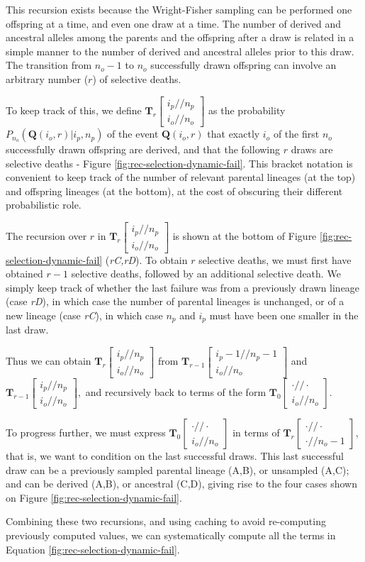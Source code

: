 \documentclass[review]{elsarticle}
\newcommand{\dslash}{/\!\!/}
\newcommand{\Coalc}[4]{\begin{bmatrix}#1\dslash #2 \\ #3\dslash #4 \end{bmatrix}}
\begin{document}
This recursion exists because the Wright-Fisher sampling can be performed one offspring at a time,
and even one draw at a time. The number of derived and ancestral alleles among the parents and the
offspring after a draw is related in a simple manner to the number of derived and ancestral alleles
prior to this draw. The transition from $n_o-1$ to $n_o$ successfully drawn offspring can involve an
arbitrary number ($r$) of selective deaths. 

To keep track of this, we define $\mathbf{T}_{r}\Coalc{i_p}{n_p}{i_o}{n_o}$ as the probability
$P_{n_o}(\mathbf{Q}(i_o,r) | i_p, n_p)$ of the event $\mathbf{Q}(i_o,r)$ that exactly $i_o$ of the
first $n_o$ successfully drawn offspring are derived, and that the following $r$ draws are selective
deaths - Figure \ref{fig:rec-selection-dynamic-fail}. This bracket notation is convenient to keep track of
the number of relevant parental lineages (at the top) and offspring lineages (at the bottom), at the
cost of obscuring their different probabilistic role.
  
The recursion over $r$ in $\mathbf{T}_{r}\Coalc{i_p}{n_p}{i_o}{n_o}$ is shown at the bottom of
Figure \ref{fig:rec-selection-dynamic-fail} (\textit{rC,rD}). To obtain $r$ selective deaths, we
must first have obtained $r-1$ selective deaths, followed by an additional selective death. We
simply keep track of whether the last failure was from a previously drawn lineage (case
\textit{rD}), in which case the number of parental lineages is unchanged, or of a new lineage (case
\textit{rC}), in which case $n_p$ and $i_p$ must have been one smaller in the last draw.
 
Thus we can obtain $\mathbf{T}_{r}\Coalc{i_p}{n_p}{i_o}{n_o}$ from
$\mathbf{T}_{r-1}\Coalc{i_p-1}{n_p-1}{i_o}{n_o}$ and $\mathbf{T}_{r-1}\Coalc{i_p}{n_p}{i_o}{n_o},$
and recursively back to terms of the form $\mathbf{T}_{0}\Coalc{\cdot}{\cdot}{i_o}{n_o}$.
  
To progress further, we must express $\mathbf{T}_{0}\Coalc{\cdot}{\cdot}{i_o}{n_o}$ in terms of
$\mathbf{T}_{r}\Coalc{\cdot}{\cdot}{\cdot}{n_o-1}$, that is, we want to condition on the last
successful draws. This last successful draw can be a previously sampled parental lineage (A,B), or
unsampled (A,C); and can be derived (A,B), or ancestral (C,D), giving rise to the four cases shown on Figure
\ref{fig:rec-selection-dynamic-fail}.
  
Combining these two recursions, and using caching to avoid re-computing previously computed values,
we can systematically compute all the terms in Equation \ref{fig:rec-selection-dynamic-fail}.
\end{document}
